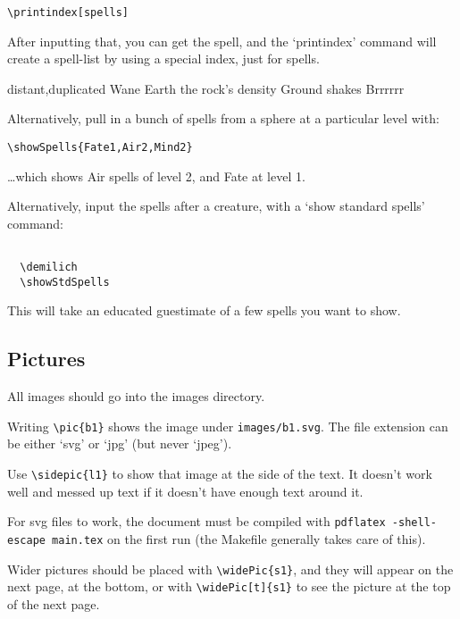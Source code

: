 \documentclass[a4paper,openany]{book}
\begin{document}
\begin{multicols}{2}
\begin{verbatim}
\printindex[spells]
\end{verbatim}

After inputting that, you can get the spell, and the `printindex' command will create a spell-list by using a special index, just for spells.

  {distant,duplicated}%
  {Wane}%
  {Earth}%
  {the rock's density}%
  {Ground shakes}%
  {Brrrrrr}%

Alternatively, pull in a bunch of spells from a sphere at a particular level with:

\verb"\showSpells{Fate1,Air2,Mind2}"


\ldots which shows Air spells of level 2, and Fate at level 1.

Alternatively, input the spells after a creature, with a `show standard spells' command:

\begin{verbatim}

  \demilich
  \showStdSpells

\end{verbatim}

This will take an educated guestimate of a few spells you want to show.

\demilich

\showStdSpells

\subsection{Pictures}


All images should go into the images directory.

Writing \verb"\pic{b1}" shows the image under \verb"images/b1.svg".
The file extension can be either `svg' or `jpg' (but never `jpeg').

Use \verb"\sidepic{l1}" to show that image at the side of the text.
It doesn't work well and messed up text if it doesn't have enough text around it.


For svg files to work, the document must be compiled with \verb"pdflatex -shell-escape main.tex" on the first run (the Makefile generally takes care of this).

Wider pictures should be placed with \verb"\widePic{s1}", and they will appear on the next page, at the bottom, or with \verb"\widePic[t]{s1}" to see the picture at the top of the next page.


\end{multicols}
\end{document}
